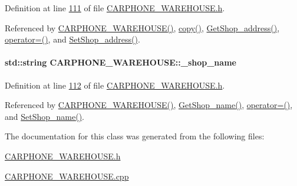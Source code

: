 Definition at line \hyperlink{_c_a_r_p_h_o_n_e___w_a_r_e_h_o_u_s_e_8h_source_l00111}{111} of file \hyperlink{_c_a_r_p_h_o_n_e___w_a_r_e_h_o_u_s_e_8h_source}{C\+A\+R\+P\+H\+O\+N\+E\+\_\+\+W\+A\+R\+E\+H\+O\+U\+S\+E.\+h}.



Referenced by \hyperlink{_c_a_r_p_h_o_n_e___w_a_r_e_h_o_u_s_e_8h_source_l00024}{C\+A\+R\+P\+H\+O\+N\+E\+\_\+\+W\+A\+R\+E\+H\+O\+U\+S\+E()}, \hyperlink{_c_a_r_p_h_o_n_e___w_a_r_e_h_o_u_s_e_8cpp_source_l00034}{copy()}, \hyperlink{_c_a_r_p_h_o_n_e___w_a_r_e_h_o_u_s_e_8cpp_source_l00127}{Get\+Shop\+\_\+address()}, \hyperlink{_c_a_r_p_h_o_n_e___w_a_r_e_h_o_u_s_e_8h_source_l00075}{operator=()}, and \hyperlink{_c_a_r_p_h_o_n_e___w_a_r_e_h_o_u_s_e_8cpp_source_l00123}{Set\+Shop\+\_\+address()}.

\paragraph[{\texorpdfstring{\+\_\+shop\+\_\+name}{_shop_name}}]{\setlength{\rightskip}{0pt plus 5cm}std\+::string C\+A\+R\+P\+H\+O\+N\+E\+\_\+\+W\+A\+R\+E\+H\+O\+U\+S\+E\+::\+\_\+shop\+\_\+name\hspace{0.3cm}{\ttfamily [private]}}\hypertarget{class_c_a_r_p_h_o_n_e___w_a_r_e_h_o_u_s_e_a4ac330ca32a05ae4391a00db62ca6128_a4ac330ca32a05ae4391a00db62ca6128}{}\label{class_c_a_r_p_h_o_n_e___w_a_r_e_h_o_u_s_e_a4ac330ca32a05ae4391a00db62ca6128_a4ac330ca32a05ae4391a00db62ca6128}


Definition at line \hyperlink{_c_a_r_p_h_o_n_e___w_a_r_e_h_o_u_s_e_8h_source_l00112}{112} of file \hyperlink{_c_a_r_p_h_o_n_e___w_a_r_e_h_o_u_s_e_8h_source}{C\+A\+R\+P\+H\+O\+N\+E\+\_\+\+W\+A\+R\+E\+H\+O\+U\+S\+E.\+h}.



Referenced by \hyperlink{_c_a_r_p_h_o_n_e___w_a_r_e_h_o_u_s_e_8h_source_l00024}{C\+A\+R\+P\+H\+O\+N\+E\+\_\+\+W\+A\+R\+E\+H\+O\+U\+S\+E()}, \hyperlink{_c_a_r_p_h_o_n_e___w_a_r_e_h_o_u_s_e_8cpp_source_l00119}{Get\+Shop\+\_\+name()}, \hyperlink{_c_a_r_p_h_o_n_e___w_a_r_e_h_o_u_s_e_8h_source_l00075}{operator=()}, and \hyperlink{_c_a_r_p_h_o_n_e___w_a_r_e_h_o_u_s_e_8cpp_source_l00115}{Set\+Shop\+\_\+name()}.



The documentation for this class was generated from the following files\+:\begin{DoxyCompactItemize}
\item 
\hyperlink{_c_a_r_p_h_o_n_e___w_a_r_e_h_o_u_s_e_8h}{C\+A\+R\+P\+H\+O\+N\+E\+\_\+\+W\+A\+R\+E\+H\+O\+U\+S\+E.\+h}\item 
\hyperlink{_c_a_r_p_h_o_n_e___w_a_r_e_h_o_u_s_e_8cpp}{C\+A\+R\+P\+H\+O\+N\+E\+\_\+\+W\+A\+R\+E\+H\+O\+U\+S\+E.\+cpp}\end{DoxyCompactItemize}
